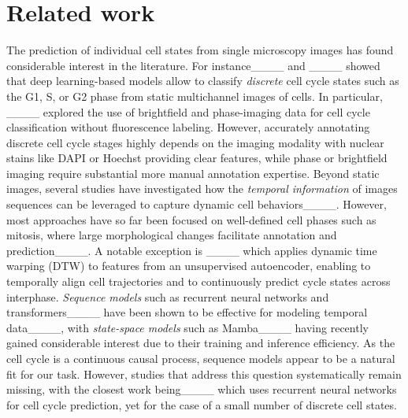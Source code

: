 \section{Related work}
The prediction of individual cell states from single microscopy images has found considerable interest in the literature. For instance____ and ____ showed that deep learning-based models allow to classify \emph{discrete} cell cycle states such as the G1, S, or G2 phase from static multichannel images of cells. In particular, ____ explored the use of brightfield and phase-imaging data for cell cycle classification without fluorescence labeling. However, accurately annotating discrete cell cycle stages highly depends on the imaging modality with nuclear stains like DAPI or Hoechst providing clear features, while phase or brightfield imaging require substantial more manual annotation expertise. 
Beyond static images, several studies have investigated how the \emph{temporal information} of images sequences can be leveraged to capture dynamic cell behaviors____. 
However, most approaches have so far been focused on well-defined cell phases such as mitosis, where large morphological changes facilitate annotation and prediction____. A notable exception is ____ which applies dynamic time warping (DTW) to features from an unsupervised autoencoder, enabling to temporally align cell trajectories and to continuously predict cycle states across interphase. 
\emph{Sequence models} such as recurrent neural networks and transformers____ have been shown to be effective for modeling temporal data____, with \emph{state-space models} such as Mamba____ having recently gained considerable interest due to their training and inference efficiency. 
As the cell cycle is a continuous causal process, sequence models appear to be a natural fit for our task. However, studies that address this question systematically remain missing, with the closest work being____ which uses recurrent neural networks for cell cycle prediction, yet for the case of a small number of discrete cell states.